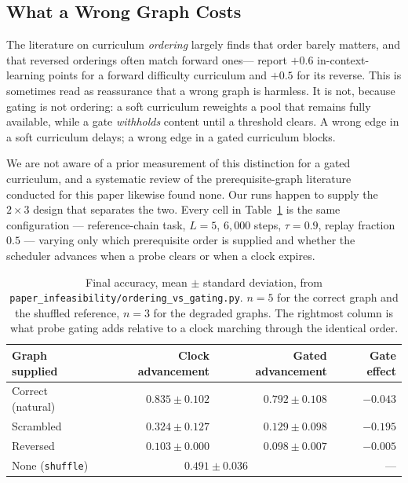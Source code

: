 \documentclass[11pt]{article}
\theoremstyle{plain}
\theoremstyle{definition}
\theoremstyle{remark}
\begin{document}
\subsection{What a Wrong Graph Costs}
\label{sec:wrong}

The literature on curriculum \emph{ordering} largely finds that order barely
matters, and that reversed orderings often match forward ones---%
\citet{wettig2024qurating} report $+0.6$ in-context-learning points for a
forward difficulty curriculum and $+0.5$ for its reverse. This is sometimes read
as reassurance that a wrong graph is harmless. It is not, because gating is not
ordering: a soft curriculum reweights a pool that remains fully available, while
a gate \emph{withholds} content until a threshold clears. A wrong edge in a soft
curriculum delays; a wrong edge in a gated curriculum blocks.

We are not aware of a prior measurement of this distinction for a gated
curriculum, and a systematic review of the prerequisite-graph literature
conducted for this paper likewise found none. Our runs happen to supply the
$2 \times 3$ design that separates the two. Every cell in
Table~\ref{tab:wrongdag} is the same configuration --- reference-chain task,
$L{=}5$, $6{,}000$ steps, $\tau = 0.9$, replay fraction $0.5$ --- varying only
which prerequisite order is supplied and whether the scheduler advances when a
probe clears or when a clock expires.

\begin{table}[ht]
\centering
\small
\begin{tabular}{@{}lrrr@{}}
\toprule
Graph supplied & Clock advancement & Gated advancement & Gate effect \\
\midrule
Correct (natural) & $\mathbf{0.835 \pm 0.102}$ & $0.792 \pm 0.108$ & $-0.043$ \\
Scrambled & $0.324 \pm 0.127$ & $0.129 \pm 0.098$ & $\mathbf{-0.195}$ \\
Reversed & $0.103 \pm 0.000$ & $0.098 \pm 0.007$ & $-0.005$ \\
\midrule
None (\texttt{shuffle}) & \multicolumn{2}{c}{$0.491 \pm 0.036$} & --- \\
\bottomrule
\end{tabular}
\caption{Final accuracy, mean $\pm$ standard deviation, from
\texttt{paper\_infeasibility/ordering\_vs\_gating.py}. $n = 5$ for the correct
graph and the shuffled reference, $n = 3$ for the degraded graphs. The rightmost
column is what probe gating adds relative to a clock marching through the
identical order.}
\label{tab:wrongdag}
\end{table}
\end{document}

